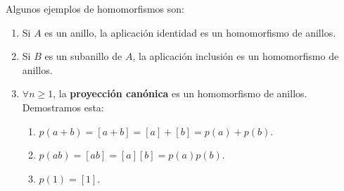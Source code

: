 \begin{ejemplo} Algunos ejemplos de homomorfismos son:
\begin{enumerate}
    \item Si $A$ es un anillo, la aplicación identidad
    es un homomorfismo de anillos.

    \item Si $B$ es un subanillo de $A$, la aplicación inclusión
    es un homomorfismo de anillos.

    \item $\forall n \geq 1$, la \textbf{proyección canónica}
    es un homomorfismo de anillos. Demostramos esta:
    \begin{enumerate}
        \item $p(a+b) = [a+b] = [a]+[b] = p(a)+p(b)$.
        \item $p(ab) = [ab] = [a][b] = p(a)p(b)$.
        \item $p(1) = [1]$.
    \end{enumerate}
\end{enumerate}
\end{ejemplo}

